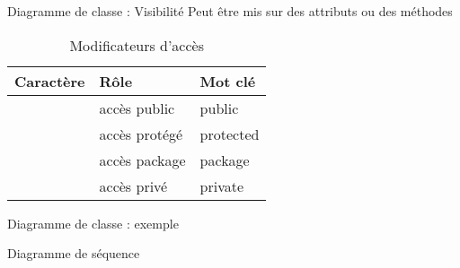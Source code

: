\begin{frame}{Diagramme de classe : Visibilité}
    Peut être mis sur des attributs ou des méthodes
    \begin{table}
        \begin{tabular}{c|l|l} 
            \toprule
            \textbf{Caractère} & \textbf{Rôle} & \textbf{Mot clé}  \\
            \midrule
            \stronghl{+} &	accès public &	public \\
            \stronghl{\#} &	accès protégé &	protected \\
            \stronghl{\textasciitilde{}} &	accès package &	package \\
            \stronghl{-} &	accès privé &	private \\
            \bottomrule
        \end{tabular}
        \caption{Modificateurs d'accès}
    \end{table}
    
    
\end{frame}
\begin{frame}{Diagramme de classe : exemple}


\end{frame}

\begin{frame}{Diagramme de séquence}


\end{frame}